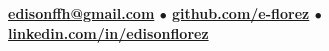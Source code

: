
\begin{center}
    \bf
    \large
    \href{mailto:edisonffh@gmail.com}{edisonffh@gmail.com}
    \hspace*{4mm}$\bullet$\hspace*{4mm}
    \href{https://github.com/e-florez}{github.com/e-florez}
    \hspace*{4mm}$\bullet$\hspace*{4mm}
    \href{https://www.linkedin.com/in/edisonflorez/}{linkedin.com/in/edisonflorez}
\end{center}
